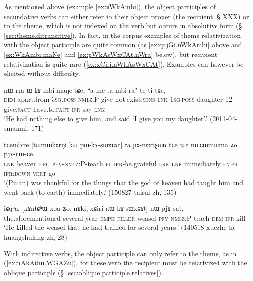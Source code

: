 As mentioned above (example \ref{ex:nWkAmbi}), the object participles of secundative verbs can either refer to their object proper (the recipient, § XXX) or to the theme, which is not indexed on the verb but occurs in absolutive form (§ \ref{sec:theme.ditransitive}). In fact, in the corpus examples of theme relativization with the object participle are quite common (as \ref{ex:qajGi.nWkAmbi} above and \ref{ex:WkAmbi.maNe} and \ref{ex:pWkAsWxCAt.nWra} below), but recipient relativization is quite rare (\ref{ex:xCiri.nWkAsWxCAt}). Examples can however be elicited without difficulty.

\begin{exe}
\ex \label{ex:WkAmbi.maNe}
\gll nɯ ma ɯ-kɤ-mbi maŋe tɕe, ``a-me ta-mbi ra" to-ti tɕe, \\
\textsc{dem} apart.from \textsc{3sg}.\textsc{poss}-\textsc{nmlz}:P-give not.exist:\textsc{sens} \textsc{lnk} \textsc{1sg}.\textsc{poss}-daughter 1\fl{}2-give:\textsc{fact}  have.to:\textsc{fact} \textsc{ifr}-say \textsc{lnk} \\
\glt `He had nothing else to give him, and said `I give you my daughter'.' (2011-04-smanmi, 171)
\end{exe}

\begin{exe}
\ex \label{ex:pWkAsWxCAt.nWra}
\gll   tɕendɤre [tɯmɯkɤrŋi kɯ pɯ-kɤ-sɯxɕɤt] ra ɲɤ-nɤxtʂɯn tɕe tɕe nɯɕɯmɯma ʑo pjɤ-nɯ-ɕe. \\
\textsc{lnk} heaven \textsc{erg} \textsc{pfv}-\textsc{nmlz}:P-teach \textsc{pl} \textsc{ifr}-be.grateful \textsc{lnk} \textsc{lnk} immediately \textsc{emph} \textsc{ifr}:\textsc{down}-\textsc{vert}-go \\
\glt `(Pu'an) was thankful for the things that the god of heaven had taught him and went back (to earth) immediately.' (150827 taisui-zh, 135)
\end{exe}

\begin{exe}
\ex \label{ex:xCiri.nWkAsWxCAt}
\gll    iɕqʰa, [kɤntɕʰɯ-xpa ʑo, nɤki, xɕiri nɯ-kɤ-sɯxɕɤt] nɯ pjɤ-sat, \\
 the.aforementioned several-year \textsc{emph} \textsc{filler} weasel \textsc{pfv}-\textsc{nmlz}:P-teach \textsc{dem} \textsc{ifr}-kill \\
\glt `He killed the weasel that he had trained for several years.'  (140518 xuezhe he huangshulang-zh, 28)
\end{exe}

With indirective verbs, the object participle can only refer to the theme, as in (\ref{ex:nAkAthu.WGAZu}), for these verb the recipient must be relativized with the oblique participle  (§ \ref{sec:oblique.participle.relatives}).

